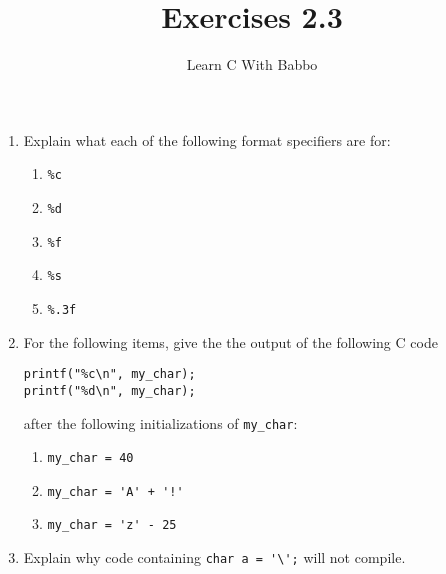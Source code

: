 \documentclass{article}
\begin{document}
\title{Exercises 2.3}
\author{Learn C With Babbo}
\date{}
\maketitle
\begin{enumerate}
\item Explain what each of the following format specifiers are for:
\begin{enumerate}
\item \verb|%c|
\item \verb|%d|
\item \verb|%f|
\item \verb|%s|
\item \verb|%.3f|
\end{enumerate}

\item For the following items, give the the output of the following C code
\begin{lstlisting}[style=CStyle]
printf("%c\n", my_char);
printf("%d\n", my_char);
\end{lstlisting}
after the following initializations of \verb|my_char|:
\begin{enumerate}
\item \verb|my_char = 40|
\item \verb|my_char = 'A' + '!'|
\item \verb|my_char = 'z' - 25|
\end{enumerate}

\item Explain why code containing \verb|char a = '\';| will not compile.


\end{enumerate}
\end{document}
